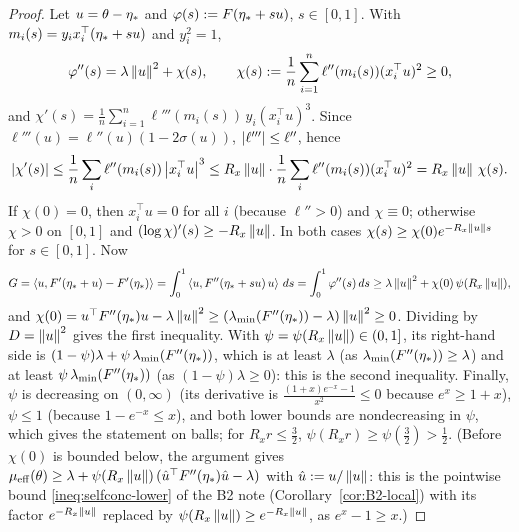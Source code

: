 \begin{proof}
Let $u=\theta-\eta_\ast$ and $\varphi(s):=F(\eta_\ast+su)$, $s\in[0,1]$. With $m_i(s)=y_ix_i^\top(\eta_\ast+su)$ and $y_i^2=1$,
\[
\varphi''(s)=\lambda\left\|u\right\|^2+\chi(s),\qquad \chi(s):=\frac1n\sum_{i=1}^n\ell''(m_i(s))(x_i^\top u)^2\ge0,
\]
and $\chi'(s)=\frac1n\sum_{i=1}^n\ell'''(m_i(s))\,y_i(x_i^\top u)^3$. Since $\ell'''(u)=\ell''(u)(1-2\sigma(u))$, $\left|\ell'''\right|\le\ell''$, hence
\[
\left|\chi'(s)\right|\le\frac1n\sum_i\ell''(m_i(s))\left|x_i^\top u\right|^3\le R_x\left\|u\right\|\cdot\frac1n\sum_i\ell''(m_i(s))(x_i^\top u)^2=R_x\left\|u\right\|\,\chi(s).
\]
If $\chi(0)=0$, then $x_i^\top u=0$ for all $i$ (because $\ell''>0$) and $\chi\equiv0$; otherwise $\chi>0$ on $[0,1]$ and $(\log\chi)'(s)\ge-R_x\left\|u\right\|$. In both cases $\chi(s)\ge\chi(0)e^{-R_x\left\|u\right\| s}$ for $s\in[0,1]$. Now
\[
G=\left\langle u, F'(\eta_\ast+u)-F'(\eta_\ast) \right\rangle=\int_0^1\left\langle u, F''(\eta_\ast+su)\,u \right\rangle\,ds=\int_0^1\varphi''(s)\,ds\ge\lambda\left\|u\right\|^2+\chi(0)\,\psi(R_x\left\|u\right\|),
\]
and $\chi(0)=u^\top F''(\eta_\ast)u-\lambda\left\|u\right\|^2\ge(\lambda_{\min}(F''(\eta_\ast))-\lambda)\left\|u\right\|^2\ge0$. Dividing by $D=\left\|u\right\|^2$ gives the first inequality. With $\psi=\psi(R_x\left\|u\right\|)\in(0,1]$, its right-hand side is $(1-\psi)\lambda+\psi\,\lambda_{\min}(F''(\eta_\ast))$, which is at least $\lambda$ (as $\lambda_{\min}(F''(\eta_\ast))\ge\lambda$) and at least $\psi\,\lambda_{\min}(F''(\eta_\ast))$ (as $(1-\psi)\lambda\ge0$): this is the second inequality. Finally, $\psi$ is decreasing on $(0,\infty)$ (its derivative is $\frac{(1+x)e^{-x}-1}{x^2}\le0$ because $e^{x}\ge1+x$), $\psi\le1$ (because $1-e^{-x}\le x$), and both lower bounds are nondecreasing in $\psi$, which gives the statement on balls; for $R_xr\le\frac32$, $\psi(R_xr)\ge\psi(\frac32)>\frac12$. (Before $\chi(0)$ is bounded below, the argument gives $\mu_{\mathrm{eff}}(\theta)\ge\lambda+\psi(R_x\left\|u\right\|)\,(\hat u^\top F''(\eta_\ast)\hat u-\lambda)$ with $\hat u:=u/\left\|u\right\|$: this is the pointwise bound \eqref{ineq:selfconc-lower} of the B2 note (Corollary~\ref{cor:B2-local}) with its factor $e^{-R_x\left\|u\right\|}$ replaced by $\psi(R_x\left\|u\right\|)\ge e^{-R_x\left\|u\right\|}$, as $e^x-1\ge x$.)
\end{proof}

